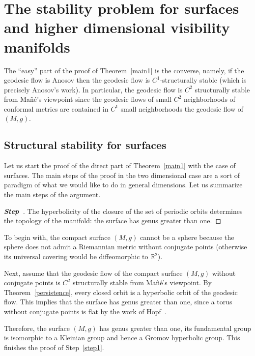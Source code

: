 \documentclass[AHL,Unicode,longabstracts,published]{cedram}
\newcommand{\bbR}{\mathbb{R}}
\newcounter{steplcount}
\newenvironment{stepl}{\refstepcounter{steplcount}\begin{proof}[\textbf{Step~\thesteplcount}]}{\let\qed\relax\end{proof}}
\begin{document}
\section{The stability problem for surfaces and higher dimensional visibility manifolds}\label{sect.6}

The ``easy'' part of the proof of Theorem~\ref{main1} is the converse, namely, if the geodesic flow is Anosov then the geodesic flow is $C^{1}$-structurally stable (which is precisely Anosov's work). In particular, the geodesic flow is $C^{2}$ structurally stable from Mañé's viewpoint since the geodesic flows of small $C^{2}$ neighborhoods of conformal metrics are contained in $C^{1}$ small neighborhoods the geodesic flow of $(M,g)$.

\subsection{Structural stability for surfaces}
Let us start the proof of the direct part of Theorem~\ref{main1} with the case of surfaces. The main steps of the proof in the two dimensional case are a sort of paradigm of what we would like to do in general dimensions. Let us summarize the main steps of the argument.

\begin{stepl}\label{step1}
The hyperbolicity of the closure of the set of periodic orbits determines the topology of the manifold: the surface has genus greater than one.
\end{stepl}

To begin with, the compact surface $(M,g)$ cannot be a sphere because the sphere does not admit a Riemannian metric without conjugate points (otherwise its universal covering would be diffeomorphic to $\bbR^{2}$).

Next, assume that the geodesic flow of the compact surface $(M,g)$ without conjugate points is $C^{2}$ structurally stable from Mañé's viewpoint. By Theorem~\ref{persistence}, every closed orbit is a hyperbolic orbit of the geodesic flow. This implies that the surface has genus greater than one, since a torus without conjugate points is flat by the work of Hopf~\cite{kn:Hopf}.

Therefore, the surface $(M,g)$ has genus greater than one, its fundamental group is isomorphic to a Kleinian group and hence a Gromov hyperbolic group. This finishes the proof of Step~\ref{step1}.
\end{document}
